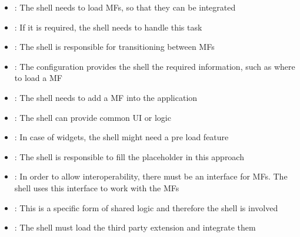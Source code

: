 \begin{itemize}
      \item \textit{}:
            The shell needs to load \acp{MF}, so that they can be integrated

      \item \textit{}:
            If it is required, the shell needs to handle this task

      \item \textit{}:
            The shell is responsible for transitioning between \acp{MF}

      \item \textit{}:
            The configuration provides the shell the required information, such as where to load a \ac{MF}

      \item \textit{}:
            The shell needs to add a \ac{MF} into the application

      \item \textit{}:
            The shell can provide common \ac{UI} or logic

      \item \textit{}:
            In case of widgets, the shell might need a pre load feature

      \item \textit{}:
            The shell is responsible to fill the placeholder in this approach

      \item \textit{}:
            In order to allow interoperability, there must be an interface for \acp{MF}. The shell uses this interface to work with the \acp{MF}

      \item \textit{}:
            This is a specific form of shared logic and therefore the shell is involved

      \item \textit{}:
            The shell must load the third party extension and integrate them


\end{itemize}
